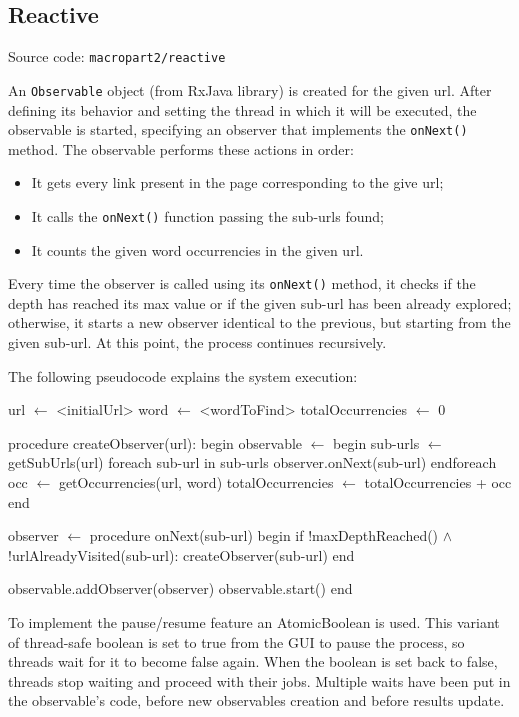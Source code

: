 \documentclass[12pt, a4paper]{report}
\begin{document}
\subsection{Reactive}
Source code: \texttt{macropart2/reactive}

An \texttt{Observable} object (from RxJava library) is created  for the given url.
After defining its behavior and setting the thread in which it will be executed, the observable is started, specifying an observer that implements the \texttt{onNext()} method.
The observable performs these actions in order:
\begin{itemize}
    \item It gets every link present in the page corresponding to the give url;
    \item It calls the \texttt{onNext()} function passing the sub-urls found;
    \item It counts the given word occurrencies in the given url.
\end{itemize}
Every time the observer is called using its \texttt{onNext()} method, it checks if the depth has reached its max value or if the given sub-url has been already explored; otherwise, it starts a new observer identical to the previous, but starting from the given sub-url.
At this point, the process continues recursively.

The following pseudocode explains the system execution:

\begin{algorithm}[label={alg4}]
url $\gets$ <initialUrl>
word $\gets$ <wordToFind>
totalOccurrencies $\gets$ 0

procedure createObserver(url):
    begin
        observable $\gets$ 
            begin
                sub-urls $\gets$ getSubUrls(url)
                foreach sub-url in sub-urls
                    observer.onNext(sub-url)
                endforeach
                occ $\gets$ getOccurrencies(url, word)
                totalOccurrencies $\gets$ totalOccurrencies + occ
            end
        
        observer $\gets$
            procedure onNext(sub-url)
                begin
                    if !maxDepthReached() $\wedge$ !urlAlreadyVisited(sub-url):
                        createObserver(sub-url)
                end

        observable.addObserver(observer)
        observable.start()
    end
\end{algorithm}

To implement the pause/resume feature an AtomicBoolean is used.
This variant of thread-safe boolean is set to true from the GUI to pause the process, so threads wait for it to become false again.
When the boolean is set back to false, threads stop waiting and proceed with their jobs.
Multiple waits have been put in the observable's code, before new observables creation and before results update.
\end{document}
